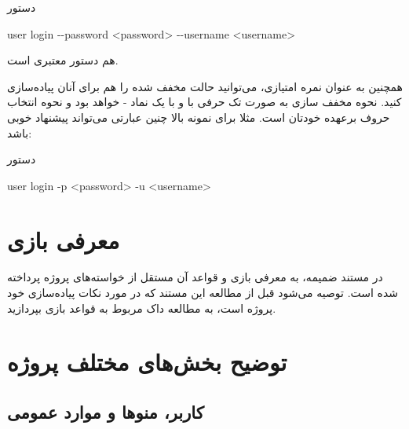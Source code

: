 \documentclass[]{article}
\begin{document}
\begin{enumerate}[label={نکته \arabic*:}]
\begin{mybox}[colback=yellow]{دستور}
	
	\begin{latin}
		
		user login -{}-password <password> -{}-username <username> 
		
	\end{latin}
	
\end{mybox}

هم دستور معتبری است.

همچنین به عنوان نمره امتیازی، می‌توانید حالت مخفف شده را هم برای آنان پیاده‌سازی کنید. نحوه مخفف سازی به صورت تک حرفی با و با یک نماد -
خواهد بود و نحوه انتخاب حروف برعهده خودتان است. مثلا برای نمونه بالا چنین عبارتی می‌تواند پیشنهاد خوبی باشد:

\begin{mybox}[colback=yellow]{دستور}
	
	
	\begin{latin}
		
		user login -p <password> -u <username> 
		
	\end{latin}
	
\end{mybox}


\end{enumerate}




\newpage


\section*{{\titr معرفی بازی}}

در مستند ضمیمه، به معرفی بازی و قواعد آن مستقل از خواسته‌های پروژه پرداخته شده است. توصیه می‌شود قبل از مطالعه این مستند که در مورد نکات پیاده‌سازی خود پروژه است، به مطالعه داک مربوط به قواعد بازی بپردازید.





\section*{{\titr توضیح بخش‌های مختلف پروژه}}



\subsection*{{\titr کاربر، منوها و موارد عمومی}}
\end{document}
